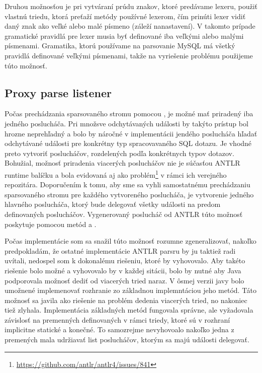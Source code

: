 Druhou možnosťou je pri vytváraní prúdu znakov, ktoré predávame lexeru, použiť vlastnú triedu, ktorá preťaží metódy používné lexerom, čím prinúti lexer vidiť daný znak ako veľké alebo malé písmeno (záleží nanastavení). V takomto prípade gramatické pravidlá pre lexer musia byť definované iba veľkými alebo malými písmenami. Gramatika, ktorú používame na parsovanie MySQL má všetký pravidlá definované veľkými písmenami, takže na vyriešenie problému použijeme túto možnosť. 

\subsection{Proxy parse listener}
Počas prechádzania sparsovaného stromu pomocou , je možné mať priradený iba jedného poslucháča. Pri množsve odchytávaných události by takýto prístup bol hrozne neprehľadný a bolo by náročné v implementácii jendého poslucháča hľadať odchytávané události pre konkrétny typ spracovavaného SQL dotazu. Je vhodné preto vytvoriť poslucháčov, rozdelených podľa konkrétnych typov dotazov. Bohužial, možnosť priradenia viacerých poslucháčov nie je súčasťou ANTLR runtime balíčku a bola evidovaná aj ako problém\footnote{\url{https://github.com/antlr/antlr4/issues/841}} v rámci ich verejného repozitára. Doporučením k tomu, aby sme sa vyhli samostatnému prechádzaniu sparsovaného stromu pre každého vytvoreného poslucháča, je vytvorenie jedného hlavného poslucháča, ktorý bude delegovať všetky události na predom definovaných poslucháčov. Vygenerovaný poslucháč od ANTLR túto možnosť poskytuje pomocou metód  a .

Počas implementácie som sa snažil túto možnosť rozumne zgeneralizovať, nakoľko predpokladám, že ostatné implementácie ANTLR parsru by ju taktiež radi uvítali, nedospel som k dokonalému riešeniu, ktoré by vyhovovalo. Aby takéto riešenie bolo možné a vyhovovalo by v každej sitácii, bolo by nutné aby Java podporovala možnosť dediť od viacerých tried naraz. V ôsmej verzii javy bolo umožnené implemenovať rozhranie zo základnou implemntáciou jeho metód. Táto možnosť sa javila ako riešenie na problém dedenia viacerých tried, no nakoniec tiež zlyhala. Implementácia základných metód fungovala správne, ale vyžadovala závislosť na premenných definovaných v rámci triedy, ktoré sú v rozhraní implicitne statické a konečné. To samozrejme nevyhovoalo nakoľko jedna z premených mala udržiavať list poslucháčov, ktorým sa majú události delegovať.

